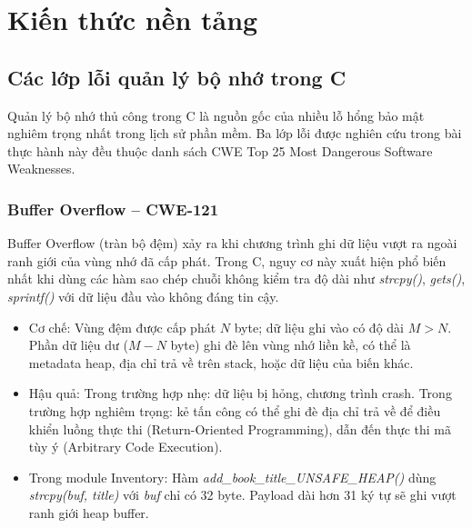 
\section{Kiến thức nền tảng}
\label{sec:kienthuc}

\subsection{Các lớp lỗi quản lý bộ nhớ trong C}

Quản lý bộ nhớ thủ công trong C là nguồn gốc của nhiều lỗ hổng bảo mật nghiêm
trọng nhất trong lịch sử phần mềm. Ba lớp lỗi được nghiên cứu trong bài thực
hành này đều thuộc danh sách CWE Top 25 Most Dangerous Software Weaknesses.

\subsubsection{Buffer Overflow -- CWE-121}

Buffer Overflow (tràn bộ đệm) xảy ra khi chương trình ghi dữ liệu vượt ra ngoài
ranh giới của vùng nhớ đã cấp phát. Trong C, nguy cơ này xuất hiện phổ biến
nhất khi dùng các hàm sao chép chuỗi không kiểm tra độ dài như \textit{strcpy()},
\textit{gets()}, \textit{sprintf()} với dữ liệu đầu vào không đáng tin cậy.

\begin{itemize}
    \item Cơ chế: Vùng đệm được cấp phát $N$ byte; dữ liệu ghi vào có
          độ dài $M > N$. Phần dữ liệu dư ($M - N$ byte) ghi đè lên vùng nhớ
          liền kề, có thể là metadata heap, địa chỉ trả về trên stack, hoặc dữ
          liệu của biến khác.
    \item Hậu quả: Trong trường hợp nhẹ: dữ liệu bị hỏng, chương trình
          crash. Trong trường hợp nghiêm trọng: kẻ tấn công có thể ghi đè địa
          chỉ trả về để điều khiển luồng thực thi (Return-Oriented Programming),
          dẫn đến thực thi mã tùy ý (Arbitrary Code Execution).
    \item Trong module Inventory: Hàm \textit{add\_book\_title\_UNSAFE\_HEAP()}
          dùng \textit{strcpy(buf, title)} với \textit{buf} chỉ có 32 byte. Payload
          dài hơn 31 ký tự sẽ ghi vượt ranh giới heap buffer.
\end{itemize}

